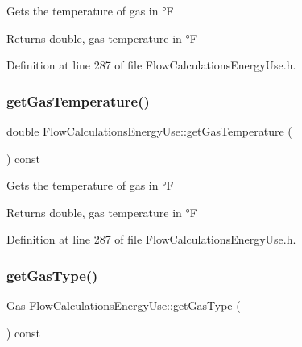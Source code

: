 Gets the temperature of gas in °F

\begin{DoxyReturn}{Returns}
double, gas temperature in °F 
\end{DoxyReturn}


Definition at line 287 of file Flow\+Calculations\+Energy\+Use.\+h.

\mbox{\label{class_flow_calculations_energy_use_a9d5782d594530c0345ac3c8faff252b3}} 
\subsubsection{\texorpdfstring{get\+Gas\+Temperature()}{getGasTemperature()}\hspace{0.1cm}{\footnotesize\ttfamily [3/3]}}
{\footnotesize\ttfamily double Flow\+Calculations\+Energy\+Use\+::get\+Gas\+Temperature (\begin{DoxyParamCaption}{ }\end{DoxyParamCaption}) const\hspace{0.3cm}{\ttfamily [inline]}}

Gets the temperature of gas in °F

\begin{DoxyReturn}{Returns}
double, gas temperature in °F 
\end{DoxyReturn}


Definition at line 287 of file Flow\+Calculations\+Energy\+Use.\+h.

\mbox{\label{class_flow_calculations_energy_use_a04df0a0c655c4aef3d5a4539d57fec2e}} 
\subsubsection{\texorpdfstring{get\+Gas\+Type()}{getGasType()}\hspace{0.1cm}{\footnotesize\ttfamily [1/3]}}
{\footnotesize\ttfamily \hyperlink{class_flow_calculations_energy_use_a840d5a836e7b05d6791b79bace4440f2}{Gas} Flow\+Calculations\+Energy\+Use\+::get\+Gas\+Type (\begin{DoxyParamCaption}{ }\end{DoxyParamCaption}) const\hspace{0.3cm}{\ttfamily [inline]}}

